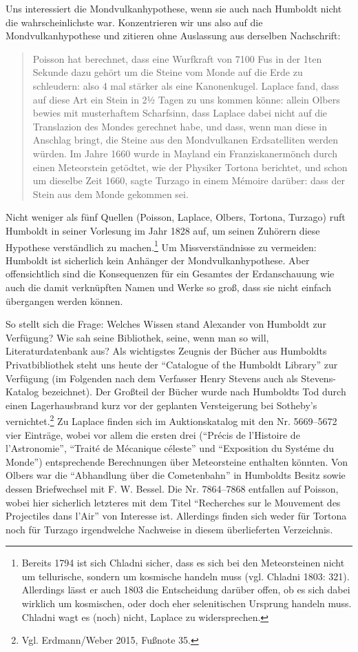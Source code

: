 \documentclass[output=paper]{langsci/langscibook}
\begin{document}
Uns interessiert die Mondvulkanhypothese, wenn sie auch nach Humboldt
nicht die wahrscheinlichste war. Konzentrieren wir uns also auf die
Mondvulkanhypothese und zitieren ohne Auslassung aus derselben
Nachschrift:

\begin{quote}
Poisson hat berechnet, dass eine Wurfkraft von 7100 Fus in der 1ten
Sekunde dazu gehört um die Steine vom Monde auf die Erde zu schleudern:
also 4 mal stärker als eine Kanonenkugel. Laplace fand, dass auf diese
Art ein Stein in 2½ Tagen zu uns kommen könne: allein Olbers bewies mit
musterhaftem Scharfsinn, dass Laplace dabei nicht auf die Translazion
des Mondes gerechnet habe, und dass, wenn man diese in Anschlag bringt,
die Steine aus den Mondvulkanen Erdsatelliten werden würden. Im Jahre
1660 wurde in Mayland ein Franziskanermönch durch einen Meteorstein
getödtet, wie der Physiker Tortona berichtet, und schon um dieselbe Zeit
1660, sagte Turzago in einem Mémoire darüber: dass der Stein aus dem
Monde gekommen sei.
\end{quote}

Nicht weniger als fünf Quellen (Poisson, Laplace, Olbers, Tortona,
Turzago) ruft Humboldt in seiner Vorlesung im Jahr 1828 auf, um seinen
Zuhörern diese Hypothese verständlich zu machen.\footnote{Bereits 1794
  ist sich Chladni sicher, dass es sich bei den Meteorsteinen nicht um
  tellurische, sondern um kosmische handeln muss (vgl. Chladni 1803:
  321). Allerdings lässt er auch 1803 die Entscheidung darüber offen, ob
  es sich dabei wirklich um kosmischen, oder doch eher selenitischen
  Ursprung handeln muss. Chladni wagt es (noch) nicht, Laplace zu
  widersprechen.} Um Missverständnisse zu vermeiden: Humboldt ist
sicherlich kein Anhänger der Mondvulkanhypothese. Aber offensicht\-lich
sind die Konsequenzen für ein Gesamtes der Erdanschauung wie auch die
damit verknüpften Namen und Werke so groß, dass sie nicht einfach
übergangen werden können.

So stellt sich die Frage: Welches Wissen stand Alexander von Humboldt
zur Verfügung? Wie sah seine Bibliothek, seine, wenn man so will,
Literaturdatenbank aus? Als wichtigstes Zeugnis der Bücher aus Humboldts
Privatbibliothek steht uns heute der \enquote{Catalogue of the Humboldt
Library} zur Verfügung (im Folgenden nach dem Verfasser Henry Stevens
auch als Stevens-Katalog bezeichnet). Der Großteil der Bücher wurde nach
Humboldts Tod durch einen Lagerhausbrand kurz vor der geplanten
Versteigerung bei Sotheby's vernichtet.\footnote{Vgl. Erdmann/Weber
  2015, Fußnote 35.} Zu Laplace finden sich im Auktionskatalog mit den
Nr. 5669--5672 vier Einträge, wobei vor allem die ersten drei
(\enquote{Précis de l'Histoire de l'Astronomie}, \enquote{Traité de
Mécanique céleste} und \enquote{Exposition du Systéme du Monde})
entsprechende Berechnungen über Meteorsteine enthalten könnten. Von
Olbers war die \enquote{Abhandlung über die Cometenbahn} in Humboldts
Besitz sowie dessen Briefwechsel mit F. W. Bessel. Die Nr. 7864--7868
entfallen auf Poisson, wobei hier sicherlich letzteres mit dem Titel
\enquote{Recherches sur le Mouvement des Projectiles dans l'Air} von
Interesse ist. Allerdings finden sich weder für Tortona noch für Turzago
irgendwelche Nachweise in diesem überlieferten Verzeichnis.
\end{document}
